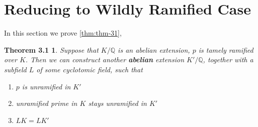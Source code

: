 \section{Reducing to Wildly Ramified Case}
In this section we prove \autoref{thm:thm-31},
\newtheorem*{restatementa}{Theorem 3.1}
\begin{restatementa}
    Suppose that $K/\mathbb{Q}$ is an abelian extension, $p$ is tamely ramified over $K$. Then we can construct another \textbf{abelian} extension $K'/\mathbb{Q}$, together with a subfield $L$ of some cyclotomic field, such that
        \begin{enumerate}
            \item $p$ is unramified in $K'$
            \item unramified prime in $K$ stays unramified in $K'$
            \item $LK=LK'$
        \end{enumerate}
\end{restatementa}
